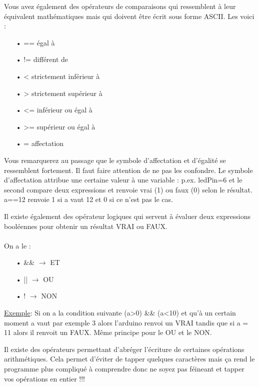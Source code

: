 \documentclass[12pt,a4paper]{article}
\begin{document}
\bigskip

Vous avez également des opérateurs de comparaisons qui ressemblent à leur équivalent mathématiques mais qui doivent être écrit sous forme ASCII. Les voici : 

\begin{itemize}
   \item[•] == égal à
   \item[•] != différent de
   \item[•] < strictement inférieur à
   \item[•] > strictement supérieur à
   \item[•] <= inférieur ou égal à
   \item[•] >= supérieur ou égal à
   \item[•] = affectation
\end{itemize}

\bigskip
Vous remarquerez au passage que le symbole d’affectation et d’égalité se ressemblent fortement. Il faut faire attention de ne pas les confondre. Le symbole d’affectation attribue une certaine valeur à une variable : p.ex. ledPin=6 et le second compare deux expressions et renvoie vrai (1) ou faux (0) selon le résultat. a==12 renvoie 1 si a vaut 12 et 0 si ce n’est pas le cas.

\bigskip
Il existe également des opérateur logiques qui servent à évaluer deux expressions booléennes pour obtenir un résultat VRAI ou FAUX.
\\
\\
On a le :

\begin{itemize}
\bigskip
   \item[•] \&\& $\rightarrow$ ET
   \item[•] || $\rightarrow$ OU
   \item[•] ! $\rightarrow$ NON
\end{itemize}

\bigskip
\underline{Exemple}: Si on a la condition suivante  (a>0) \&\& (a<10) et qu’à un certain moment a vaut par exemple 3 alors l’arduino renvoi un VRAI tandis que si a = 11 alors il renvoit un FAUX. Même principe pour le OU et le NON.

\bigskip
Il existe des opérateurs permettant d’abréger l’écriture de certaines opérations arithmétiques. Cela permet d’éviter de tapper quelques caractères  mais ça rend le programme plus compliqué à comprendre donc ne soyez pas féineant et tapper vos opérations en entier !!!  
\end{document}
